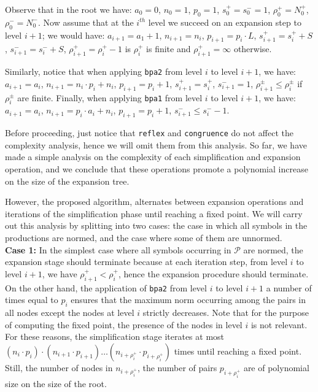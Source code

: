 Observe that in the root we have: $a_0=0$, $n_0=1$, $p_0=1$,
$s_0^+=s_0^-=1$, $\rho_0^+=N_0^+$, $\rho_0^-=N_0^-$. Now assume 
that at the $i^{th}$ level we succeed on an expansion step to
level $i+1$;
we would have: $a_{i+1}=a_1+1$, $n_{i+1}=n_i$, $p_{i+1}=p_i\cdot L$,
$s_{i+1}^+=s_i^++S$, $s_{i+1}^-=s_i^-+S$, $\rho_{i+1}^+=\rho_i^+-1$ 
is $\rho_i^+$ is finite and  $\rho_{i+1}^+ = \infty$ otherwise.

Similarly, notice that when applying \lstinline{bpa2} from level $i$
to level $i+1$, we have: $a_{i+1}=a_i$, $n_{i+1} = n_i\cdot p_i + n_i$,
$p_{i+1}=p_i+1$, $s_{i+1}^+=s_i^+$, $s_{i+1}^-=1$, 
$\rho_{i+1}^\pm\leq \rho_i^\pm$ if $\rho_i^\pm$ are finite. 
Finally, when applying \lstinline{bpa1} from level $i$
to level $i+1$, we have: $a_{i+1}=a_i$, $n_{i+1} = p_i \cdot a_i+n_i$,
$p_{i+1}=p_i+1$, $s_{i+1}^- \leq s_i^- - 1$.

Before proceeding, just notice that \lstinline{reflex} and 
\lstinline{congruence} do not affect the complexity analysis, hence 
we will omit them from this analysis.
So far, we have made a simple analysis on the complexity of each 
simplification and expansion operation, and we conclude that
these operations promote a polynomial increase on the size of the
expansion tree. 

However, the proposed algorithm, alternates between expansion 
operations and iterations of the simplification phase until 
reaching a fixed point. We will carry out this analysis by 
splitting into two cases: the case in which all symbols 
in the productions are normed, and the case where some
of them are unnormed.\\

\noindent\textbf{Case 1:} In the simplest case where all symbols
occurring in $\mathcal{P}$ are normed, the expansion stage should 
terminate because at each iteration step, from level $i$ to level
$i+1$, we have $\rho_{i+1}^+ < \rho_i^+$, hence the expansion procedure 
should terminate.
On the other hand, the application of \lstinline{bpa2} from 
level $i$ to level $i+1$ a number of times equal to $p_i$
ensures that the maximum norm occurring among the pairs in
all nodes except the nodes at level $i$ strictly decreases.
Note that for the purpose of computing the fixed point, the
presence of the nodes in level $i$ is not relevant.
For these reasons, the simplification stage iterates at most 
$(n_i\cdot p_i)\cdot (n_{i+1}\cdot p_{i+1})\ldots (n_{i+\rho_i^+}\cdot
p_{i+\rho_i^+})$ times until reaching a fixed point. 
Still, the number of nodes in $n_{i+\rho_i^+}$, 
the number of pairs $p_{i+\rho_i^+}$ are of polynomial size on the 
size of the root.\\

